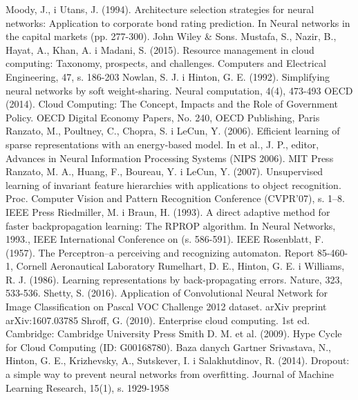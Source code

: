 \documentclass[12pt,a4paper,twoside]{article}
\begin{document}
\begin{thebibliography}{99}
 Moody, J., i Utans, J. (1994). Architecture selection strategies for neural networks: Application to corporate bond rating prediction. In Neural networks in the capital markets (pp. 277-300). John Wiley \& Sons.
 Mustafa, S., Nazir, B., Hayat, A., Khan, A. i Madani, S. (2015). Resource management in cloud computing: Taxonomy, prospects, and challenges. Computers and Electrical Engineering, 47, s. 186-203
 Nowlan, S. J. i Hinton, G. E. (1992). Simplifying neural networks by soft weight-sharing. Neural computation, 4(4), 473-493
 OECD (2014). Cloud Computing: The Concept, Impacts and the Role of Government Policy. OECD Digital Economy Papers, No. 240, OECD Publishing, Paris
 Ranzato, M., Poultney, C., Chopra, S. i LeCun, Y. (2006). Efficient learning of sparse representations with an energy-based model. In et al., J. P., editor, Advances in Neural Information Processing Systems (NIPS 2006). MIT Press
 Ranzato, M. A., Huang, F., Boureau, Y. i LeCun, Y. (2007). Unsupervised learning of invariant feature hierarchies with applications to object recognition. Proc. Computer Vision and Pattern Recognition Conference (CVPR’07), s. 1–8. IEEE Press
 Riedmiller, M. i Braun, H. (1993). A direct adaptive method for faster backpropagation learning: The RPROP algorithm. In Neural Networks, 1993., IEEE International Conference on (s. 586-591). IEEE
 Rosenblatt, F. (1957). The Perceptron--a perceiving and recognizing automaton. Report 85-460-1, Cornell Aeronautical Laboratory
 Rumelhart, D. E., Hinton, G. E. i Williams, R. J. (1986). Learning representations by back-propagating errors. Nature, 323, 533-536.
 Shetty, S. (2016).  Application of Convolutional Neural Network for Image Classification on Pascal VOC Challenge 2012 dataset. arXiv preprint arXiv:1607.03785
 Shroff, G. (2010). Enterprise cloud computing. 1st ed. Cambridge: Cambridge University Press
 Smith D. M. et al. (2009). Hype Cycle for Cloud Computing (ID: G00168780). Baza danych Gartner
 Srivastava, N., Hinton, G. E., Krizhevsky, A., Sutskever, I. i Salakhutdinov, R. (2014). Dropout: a simple way to prevent neural networks from overfitting. Journal of Machine Learning Research, 15(1), s. 1929-1958

\end{thebibliography}
\end{document}
